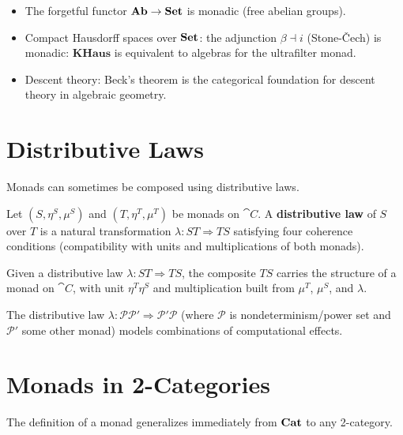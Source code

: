 \begin{example}
\begin{itemize}
  \item The forgetful functor $\mathbf{Ab} \to \mathbf{Set}$ is monadic (free abelian groups).
  \item Compact Hausdorff spaces over $\mathbf{Set}$: the adjunction $\beta \dashv i$ (Stone-Čech) is monadic: $\mathbf{KHaus}$ is equivalent to algebras for the ultrafilter monad.
  \item Descent theory: Beck's theorem is the categorical foundation for descent theory in algebraic geometry.
\end{itemize}
\end{example}

\section{Distributive Laws}

Monads can sometimes be composed using distributive laws.

\begin{definition}
Let $(S, \eta^S, \mu^S)$ and $(T, \eta^T, \mu^T)$ be monads on $\cat{C}$. A \textbf{distributive law} of $S$ over $T$ is a natural transformation $\lambda: ST \Rightarrow TS$ satisfying four coherence conditions (compatibility with units and multiplications of both monads).
\end{definition}

\begin{theorem}
Given a distributive law $\lambda: ST \Rightarrow TS$, the composite $TS$ carries the structure of a monad on $\cat{C}$, with unit $\eta^T \eta^S$ and multiplication built from $\mu^T$, $\mu^S$, and $\lambda$.
\end{theorem}

\begin{example}
The distributive law $\lambda: \mathcal{P}\mathcal{P}' \Rightarrow \mathcal{P}'\mathcal{P}$ (where $\mathcal{P}$ is nondeterminism/power set and $\mathcal{P}'$ some other monad) models combinations of computational effects.
\end{example}

\section{Monads in 2-Categories}

The definition of a monad generalizes immediately from $\mathbf{Cat}$ to any 2-category.

